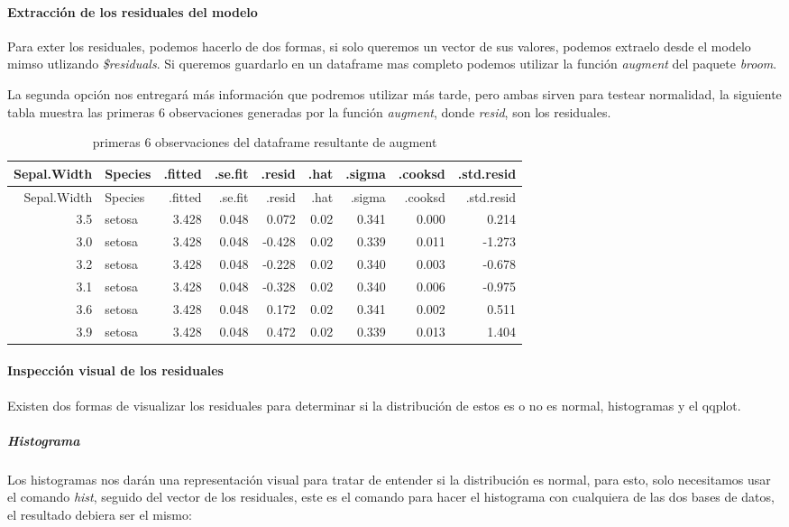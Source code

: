 \documentclass[]{article}
\let\oldparagraph\paragraph
\renewcommand{\paragraph}[1]{\oldparagraph{#1}\mbox{}}
\let\oldsubparagraph\subparagraph
\renewcommand{\subparagraph}[1]{\oldsubparagraph{#1}\mbox{}}
\begin{document}
\paragraph{Extracción de los residuales del
modelo}\label{extraccion-de-los-residuales-del-modelo}

Para exter los residuales, podemos hacerlo de dos formas, si solo
queremos un vector de sus valores, podemos extraelo desde el modelo
mimso utlizando \emph{\$residuals}. Si queremos guardarlo en un
dataframe mas completo podemos utilizar la función \emph{augment} del
paquete \emph{broom}.

La segunda opción nos entregará más información que podremos utilizar
más tarde, pero ambas sirven para testear normalidad, la siguiente tabla
muestra las primeras 6 observaciones generadas por la función
\emph{augment}, donde \emph{resid}, son los residuales.

\begin{longtable}[]{@{}rlrrrrrrr@{}}
\caption{primeras 6 observaciones del dataframe resultante de
augment}\tabularnewline
\toprule
Sepal.Width & Species & .fitted & .se.fit & .resid & .hat & .sigma &
.cooksd & .std.resid\tabularnewline
\midrule
\endfirsthead
\toprule
Sepal.Width & Species & .fitted & .se.fit & .resid & .hat & .sigma &
.cooksd & .std.resid\tabularnewline
\midrule
\endhead
3.5 & setosa & 3.428 & 0.048 & 0.072 & 0.02 & 0.341 & 0.000 &
0.214\tabularnewline
3.0 & setosa & 3.428 & 0.048 & -0.428 & 0.02 & 0.339 & 0.011 &
-1.273\tabularnewline
3.2 & setosa & 3.428 & 0.048 & -0.228 & 0.02 & 0.340 & 0.003 &
-0.678\tabularnewline
3.1 & setosa & 3.428 & 0.048 & -0.328 & 0.02 & 0.340 & 0.006 &
-0.975\tabularnewline
3.6 & setosa & 3.428 & 0.048 & 0.172 & 0.02 & 0.341 & 0.002 &
0.511\tabularnewline
3.9 & setosa & 3.428 & 0.048 & 0.472 & 0.02 & 0.339 & 0.013 &
1.404\tabularnewline
\bottomrule
\end{longtable}

\paragraph{Inspección visual de los
residuales}\label{inspeccion-visual-de-los-residuales}

Existen dos formas de visualizar los residuales para determinar si la
distribución de estos es o no es normal, histogramas y el qqplot.

\subparagraph{Histograma}\label{histograma}

Los histogramas nos darán una representación visual para tratar de
entender si la distribución es normal, para esto, solo necesitamos usar
el comando \emph{hist}, seguido del vector de los residuales, este es el
comando para hacer el histograma con cualquiera de las dos bases de
datos, el resultado debiera ser el mismo:
\end{document}
